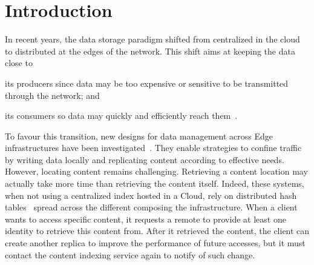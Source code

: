 
\section{Introduction}


In recent years, the data storage paradigm shifted from centralized in
the cloud to distributed at the edges of the network. 
This shift aims at keeping the data close to
\begin{inparaenum}[(i)]
\item its producers since data may be too expensive or sensitive to be
  transmitted through the network; and
\item its consumers so data may quickly and efficiently reach
  them~\cite{cachier, foggy_cache, shi2016edge}.
\end{inparaenum}
%
To favour this transition, new designs for data management across Edge
infrastructures have been investigated~\cite{confais2017object,
  confais2017performance, fogstore, hasenburg2020towards}.  They
enable strategies to confine traffic by writing data locally and
replicating content according to effective needs. However, locating
content remains challenging. Retrieving a content location may
actually take more time than retrieving the content itself.
%
Indeed, these systems, when not using a centralized index hosted in a
Cloud, rely on distributed hash tables~\cite{maymounkov2002kademlia}
spread across the different \processes composing the
infrastructure. When a client wants to access specific content, it
requests a remote \process to provide at least one \process identity
to retrieve this content from. After it retrieved the content, the
client can create another replica to improve the performance of future
accesses, but it must contact the content indexing service again to
notify of such change.
%

